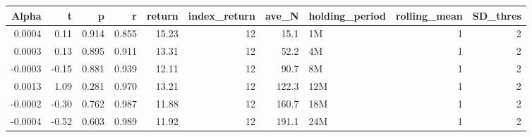 \begin{table}[ht]
\centering
\begin{tabular}{rrrrrrrlrr}
  \hline
Alpha & t & p & r & return & index\_return & ave\_N & holding\_period & rolling\_mean & SD\_thres \\ 
  \hline
0.0004 & 0.11 & 0.914 & 0.855 & 15.23 & 12 & 15.1 & 1M &  1 &  2 \\ 
  0.0003 & 0.13 & 0.895 & 0.911 & 13.31 & 12 & 52.2 & 4M &  1 &  2 \\ 
  -0.0003 & -0.15 & 0.881 & 0.939 & 12.11 & 12 & 90.7 & 8M &  1 &  2 \\ 
  0.0013 & 1.09 & 0.281 & 0.970 & 13.21 & 12 & 122.3 & 12M &  1 &  2 \\ 
  -0.0002 & -0.30 & 0.762 & 0.987 & 11.88 & 12 & 160.7 & 18M &  1 &  2 \\ 
  -0.0004 & -0.52 & 0.603 & 0.989 & 11.92 & 12 & 191.1 & 24M &  1 &  2 \\ 
   \hline
\end{tabular}
\end{table}


